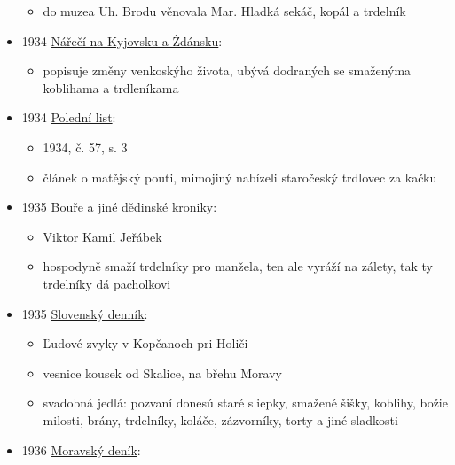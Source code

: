 \begin{itemize}
  \begin{itemize}
  \tightlist
  \item
    do muzea Uh. Brodu věnovala Mar. Hladká sekáč, kopál a trdelník
  \end{itemize}
\item
  1934
  \href{https://ceskadigitalniknihovna.cz/view/uuid:e1259815-3caf-4b6b-af1d-8ada80900484?page=uuid\%3A8bb1ba0a-525b-11e5-a788-0050569d679d&fulltext=trdeln\%C3\%ADk\%20OR\%20trdeln\%C3\%ADky\%20OR\%20trdeln\%C3\%ADk\%C5\%AF&source=mzk}{Nářečí
  na Kyjovsku a Ždánsku}:

  \begin{itemize}
  \tightlist
  \item
    popisuje změny venkoskýho života, ubývá dodraných se smaženýma
    koblihama a trdleníkama
  \end{itemize}
\item
  1934
  \href{https://ceskadigitalniknihovna.cz/view/uuid:c1ecf480-9c2d-11e3-8b69-005056825209?page=uuid\%3Ac53ff231-d798-11e3-94ef-5ef3fc9ae867&fulltext=trdlovec&source=nkp}{Polední
  list}:

  \begin{itemize}
  \tightlist
  \item
    1934, č. 57, s. 3
  \item
    článek o matějský pouti, mimojiný nabízeli staročeský trdlovec za
    kačku
  \end{itemize}
\item
  1935
  \href{https://ceskadigitalniknihovna.cz/view/uuid:9e3e00c0-1eb9-11ed-bb16-005056827e52?page=uuid\%3Ac70b483f-d1ae-48f7-9b87-ec788605bd6c&fulltext=trdeln*&source=mzk}{Bouře
  a jiné dědinské kroniky}:

  \begin{itemize}
  \tightlist
  \item
    Viktor Kamil Jeřábek
  \item
    hospodyně smaží trdelníky pro manžela, ten ale vyráží na zálety, tak
    ty trdelníky dá pacholkovi
  \end{itemize}
\item
  1935
  \href{https://dikda.snk.sk/uuid/uuid:f4a7cb3d-7024-450f-80ce-8754a4385669}{Slovenský
  denník}:

  \begin{itemize}
  \tightlist
  \item
    Ľudové zvyky v Kopčanoch pri Holiči
  \item
    vesnice kousek od Skalice, na břehu Moravy
  \item
    svadobná jedlá: pozvaní donesú staré sliepky, smažené šišky,
    koblihy, božie milosti, brány, trdelníky, koláče, zázvorníky, torty
    a jiné sladkosti
  \end{itemize}
\item
  1936
  \href{https://ceskadigitalniknihovna.cz/view/uuid:21c28337-816c-4103-a6ae-143ab29b452a?page=uuid\%3A138254c0-7d8d-11e9-b171-5ef3fc9ae867&fulltext=trdeln\%C3\%ADk\%20OR\%20trdeln\%C3\%ADky\%20OR\%20trdeln\%C3\%ADk\%C5\%AF&source=nkp}{Moravský
  deník}:


\end{itemize}
